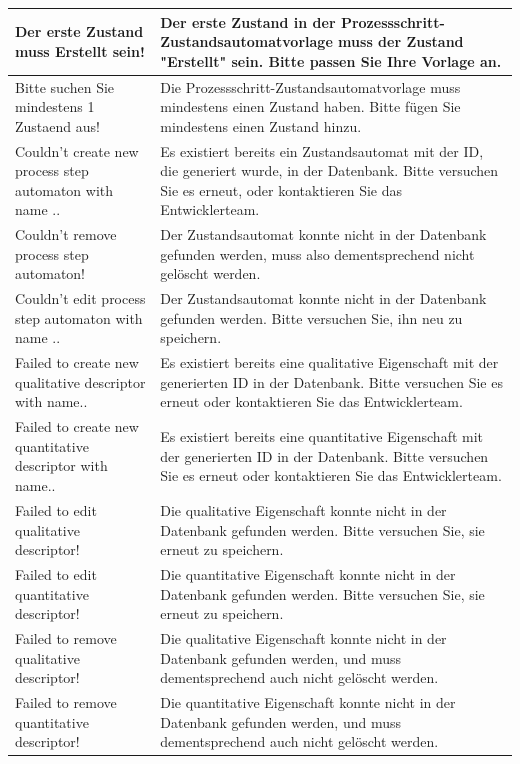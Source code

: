 \documentclass[enabledeprecatedfontcommands,fontsize=12pt,paper=a4,twoside]{scrartcl}
\begin{document}
\begin{longtable}[c]{|p{5cm}|p{10cm}|}
Der erste Zustand muss Erstellt sein! & Der erste Zustand in der Prozessschritt-Zustandsautomatvorlage muss der Zustand "Erstellt" sein. Bitte passen Sie Ihre Vorlage an.\\ \hline
Bitte suchen Sie mindestens 1 Zustaend aus! & Die Prozessschritt-Zustandsautomatvorlage muss mindestens einen Zustand haben. Bitte fügen Sie mindestens einen Zustand hinzu. \\ \hline
Couldn't create new process step automaton with name ..  & Es existiert bereits ein Zustandsautomat mit der ID, die generiert wurde, in der Datenbank. Bitte versuchen Sie es erneut, oder kontaktieren Sie das Entwicklerteam.  \\ \hline
Couldn't remove process step automaton! & Der Zustandsautomat konnte nicht in der Datenbank gefunden werden, muss also dementsprechend nicht gelöscht werden. \\ \hline
Couldn't edit process step automaton with name ..& Der Zustandsautomat konnte nicht in der Datenbank gefunden werden. Bitte versuchen Sie, ihn neu zu speichern. \\ \hline
Failed to create new qualitative descriptor with name.. & Es existiert bereits eine qualitative Eigenschaft mit der generierten ID in der Datenbank. Bitte versuchen Sie es erneut oder kontaktieren Sie das Entwicklerteam. \\ \hline
Failed to create new quantitative descriptor with name.. & Es existiert bereits eine quantitative Eigenschaft mit der generierten ID in der Datenbank. Bitte versuchen Sie es erneut oder kontaktieren Sie das Entwicklerteam. \\ \hline
Failed to edit qualitative descriptor! & Die qualitative Eigenschaft konnte nicht in der Datenbank gefunden werden. Bitte versuchen Sie, sie erneut zu speichern. \\ \hline
Failed to edit quantitative descriptor! & Die quantitative Eigenschaft konnte nicht in der Datenbank gefunden werden. Bitte versuchen Sie, sie erneut zu speichern. \\ \hline
Failed to remove qualitative descriptor! & Die qualitative Eigenschaft konnte nicht in der Datenbank gefunden werden, und muss dementsprechend auch nicht gelöscht werden. \\ \hline
Failed to remove quantitative descriptor! & Die quantitative Eigenschaft konnte nicht in der Datenbank gefunden werden, und muss dementsprechend auch nicht gelöscht werden.  \\ \hline
\end{longtable}
\end{document}
